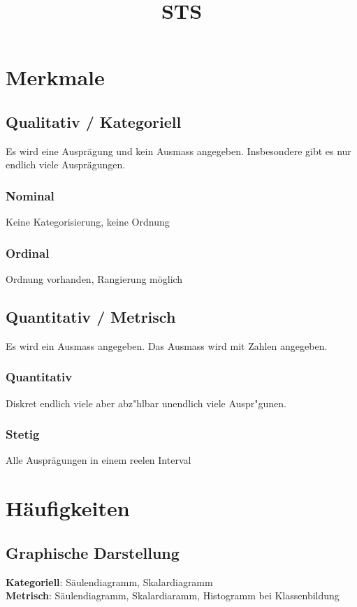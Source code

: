 \documentclass{article}
\begin{document}
	\title{STS}
	
	\section{Merkmale}
	
	\subsection{Qualitativ / Kategoriell}
	Es wird eine Auspr\"agung und kein Ausmass angegeben. Insbesondere gibt es nur endlich viele Auspr\"agungen.
	\subsubsection{Nominal}
	Keine Kategorisierung, keine Ordnung
	
	\subsubsection{Ordinal}
	Ordnung vorhanden, Rangierung möglich
	
	\subsection{Quantitativ / Metrisch}
	
	Es wird ein Ausmass angegeben. Das Ausmass wird mit Zahlen angegeben.
	
	\subsubsection{Quantitativ}
	Diskret endlich viele aber abz\a"hlbar unendlich viele Auspr\a"gunen.
	
	\subsubsection{Stetig}
	Alle Ausprägungen in einem reelen Interval


	\section{H\"aufigkeiten}
	
	\subsection{Graphische Darstellung}
	
	\textbf{Kategoriell}: Säulendiagramm, Skalardiagramm \\
	\textbf{Metrisch}: Säulendiagramm, Skalardiaramm, Histogramm bei Klassenbildung \\
	
\end{document}
